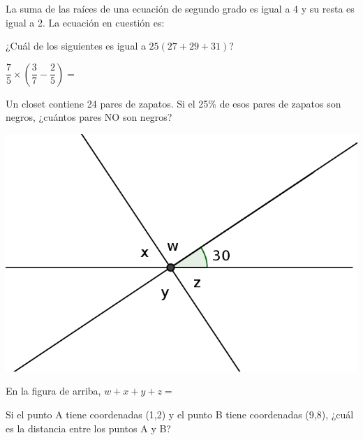 \documentclass[letterpaper,10pt]{examdesign}
\begin{document}
\begin{multiplechoice}[keycolumns=4,examcolumns=2]
\begin{block}
\end{block}
\begin{question}
La suma de las raíces de una ecuación de segundo grado es igual a 4 y su resta es igual a 2. La ecuación en cuestión es:
\end{question}
\begin{question}
¿Cuál de los siguientes es igual a $25(27+29+31)$?
\end{question}
\begin{question}
$\dfrac{7}{5}\times \left(\dfrac{3}{7}-\dfrac{2}{5}\right)=$
\end{question}
\begin{question}
Un closet contiene 24 pares de zapatos. Si el 25\% de esos pares de zapatos son negros, ¿cuántos pares NO son negros?
\end{question}
\begin{block}
\includegraphics[scale=1.1]{Images/anguloswxyz.png} 
\begin{question}
En la figura de arriba, $w+x+y+z=$
\end{question}
\end{block}
\begin{question}
Si el punto A tiene coordenadas (1,2) y el punto B tiene coordenadas (9,8), ¿cuál es la distancia entre los puntos A y B?

\end{question}
\end{multiplechoice}
\end{document}
